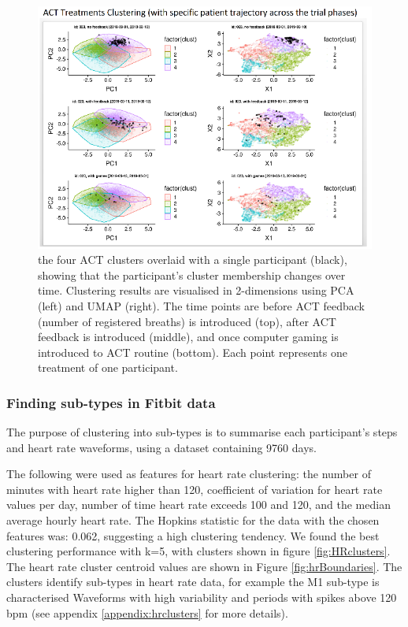 \documentclass{article}
\begin{document}
\begin{figure}[!htb]
  \centering
  \includegraphics[]{fig_ACT_clust}
  \caption{the four ACT clusters overlaid with a single participant (black), showing that the participant’s cluster membership changes over time. Clustering results are visualised in 2-dimensions using PCA (left) and UMAP (right). The time points are before ACT feedback (number of registered breaths) is introduced (top), after ACT feedback is introduced (middle), and once computer gaming is introduced to ACT routine (bottom). Each point represents one treatment of one participant. }
  \label{fig:act_res}
\end{figure}

\subsubsection{Finding sub-types in Fitbit data} 

The purpose of clustering into sub-types is to summarise each participant's steps and heart rate waveforms, using a dataset containing 9760 days. 


The following were used as features for heart rate clustering: the number of minutes with heart rate higher than 120, coefficient of variation for heart rate values per day, number of time heart rate exceeds 100 and 120, and the median average hourly heart rate. The Hopkins statistic for the data with the chosen features was: 0.062, suggesting a high clustering tendency. We found the best clustering performance with k=5, with clusters shown in figure \ref{fig:HRclusters}. The heart rate cluster centroid values are shown in Figure \ref{fig:hrBoundaries}. The clusters identify sub-types in heart rate data, for example the M1 sub-type is characterised Waveforms with high variability and periods with spikes above 120 bpm (see appendix \ref{appendix:hrclusters} for more details).  
\end{document}
